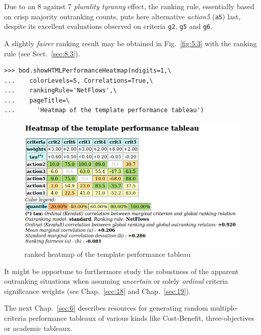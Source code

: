 Due to an 8 against 7 \emph{plurality tyranny} effect, the \Copeland ranking rule, essentially based on crisp majority outranking counts, puts here alternative \emph{action5} (\texttt{a5}) last, despite its excellent evaluations observed on criteria \texttt{g2}, \texttt{g5} and \texttt{g6}.

A slightly \emph{fairer} ranking result may be obtained in Fig.~\vref{fig:5.3} with the \NetFlows ranking rule (see Sect.~\ref{sec:8.3}).
\begin{lstlisting}
>>> bod.showHTMLPerformanceHeatmap(ndigits=1,\
...    colorLevels=5, Correlations=True,\
...    rankingRule='NetFlows',\
...    pageTitle=\
...      'Heatmap of the template performance tableau')
\end{lstlisting}
\begin{figure}[ht]
\includegraphics[width=\hsize]{Figures/5-3-templateHeatmapNF.png}
\caption{\NetFlows ranked heatmap of the template performance tableau}
\label{fig:5.3}       %
\end{figure}
It might be opportune to furthermore study the robustness of the apparent outranking situations when assuming \emph{uncertain} or solely \emph{ordinal} criteria significance weights (see Chap.~\ref{sec:18} and Chap.~\ref{sec:19}). 

\vspace{\baselineskip}

The next Chap.~\ref{sec:6} describes \Digraph resources for generating random multiple-criteria performance tableaux of various kinds like Cost-Benefit, three-objectives or academic tableaux.


%
%
